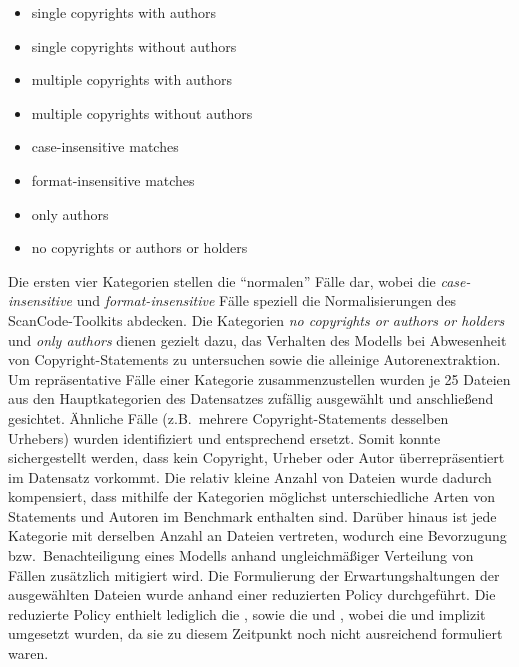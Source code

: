 \begin{itemize}
    \item single copyrights with authors
    \item single copyrights without authors
    \item multiple copyrights with authors
    \item multiple copyrights without authors
    \item case-insensitive matches
    \item format-insensitive matches
    \item only authors
    \item no copyrights or authors or holders
\end{itemize}

Die ersten vier Kategorien stellen die \enquote{normalen} Fälle dar, wobei die \textit{case-insensitive} und \textit{format-insensitive} Fälle speziell die Normalisierungen des ScanCode-Toolkits abdecken.
Die Kategorien \textit{no copyrights or authors or holders} und \textit{only authors} dienen gezielt dazu, das Verhalten des Modells bei Abwesenheit von Copyright-Statements zu untersuchen sowie die alleinige Autorenextraktion.
Um repräsentative Fälle einer Kategorie zusammenzustellen wurden je \num{25} Dateien aus den Hauptkategorien des Datensatzes zufällig ausgewählt und anschließend gesichtet.
Ähnliche Fälle (z.B.\ mehrere Copyright-Statements desselben Urhebers) wurden identifiziert und entsprechend ersetzt.
Somit konnte sichergestellt werden, dass kein Copyright, Urheber oder Autor überrepräsentiert im Datensatz vorkommt.
Die relativ kleine Anzahl von Dateien wurde dadurch kompensiert, dass mithilfe der Kategorien möglichst unterschiedliche Arten von Statements und Autoren im Benchmark enthalten sind.
Darüber hinaus ist jede Kategorie mit derselben Anzahl an Dateien vertreten, wodurch eine Bevorzugung bzw.\ Benachteiligung eines Modells anhand ungleichmäßiger Verteilung von Fällen zusätzlich mitigiert wird.
Die Formulierung der Erwartungshaltungen der ausgewählten Dateien wurde anhand einer reduzierten Policy durchgeführt.
Die reduzierte Policy enthielt lediglich die , sowie die  und , wobei die  und  implizit umgesetzt wurden, da sie zu diesem Zeitpunkt noch nicht ausreichend formuliert waren.


